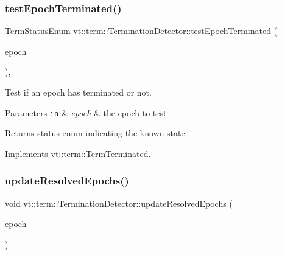 \subsubsection{\texorpdfstring{test\+Epoch\+Terminated()}{testEpochTerminated()}}
{\footnotesize\ttfamily \hyperlink{namespacevt_1_1term_ad8ec9b371608fc88e7fdeef219785b27}{Term\+Status\+Enum} vt\+::term\+::\+Termination\+Detector\+::test\+Epoch\+Terminated (\begin{DoxyParamCaption}\item[{\hyperlink{namespacevt_a985a5adf291c34a3ca263b3378388236}{Epoch\+Type}}]{epoch }\end{DoxyParamCaption})\hspace{0.3cm}{\ttfamily [override]}, {\ttfamily [virtual]}}



Test if an epoch has terminated or not. 


\begin{DoxyParams}[1]{Parameters}
\mbox{\tt in}  & {\em epoch} & the epoch to test\\
\hline
\end{DoxyParams}
\begin{DoxyReturn}{Returns}
status enum indicating the known state 
\end{DoxyReturn}


Implements \hyperlink{structvt_1_1term_1_1_term_terminated_a9d23b646c13a95738f72f7abfc8774c7}{vt\+::term\+::\+Term\+Terminated}.

\mbox{\label{structvt_1_1term_1_1_termination_detector_a7637035e3f3c0f898d8dc79bbc2d8bf4}} 
\subsubsection{\texorpdfstring{update\+Resolved\+Epochs()}{updateResolvedEpochs()}}
{\footnotesize\ttfamily void vt\+::term\+::\+Termination\+Detector\+::update\+Resolved\+Epochs (\begin{DoxyParamCaption}\item[{\hyperlink{namespacevt_a985a5adf291c34a3ca263b3378388236}{Epoch\+Type} const \&}]{epoch }\end{DoxyParamCaption})\hspace{0.3cm}{\ttfamily [private]}}



